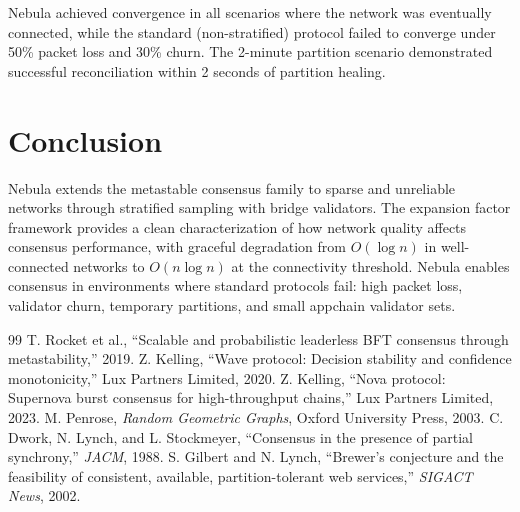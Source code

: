 \documentclass[11pt,a4paper]{article}
\begin{document}
Nebula achieved convergence in all scenarios where the network was eventually connected,
while the standard (non-stratified) protocol failed to converge under 50\% packet loss
and 30\% churn. The 2-minute partition scenario demonstrated successful reconciliation
within 2 seconds of partition healing.

\section{Conclusion}
\label{sec:conclusion}

Nebula extends the metastable consensus family to sparse and unreliable networks
through stratified sampling with bridge validators. The expansion factor framework
provides a clean characterization of how network quality affects consensus performance,
with graceful degradation from $O(\log n)$ in well-connected networks to $O(n \log n)$
at the connectivity threshold. Nebula enables consensus in environments where standard
protocols fail: high packet loss, validator churn, temporary partitions, and small
appchain validator sets.

\begin{thebibliography}{99}
 T. Rocket et al., ``Scalable and probabilistic leaderless BFT consensus through metastability,'' 2019.
 Z. Kelling, ``Wave protocol: Decision stability and confidence monotonicity,'' Lux Partners Limited, 2020.
 Z. Kelling, ``Nova protocol: Supernova burst consensus for high-throughput chains,'' Lux Partners Limited, 2023.
 M. Penrose, \emph{Random Geometric Graphs}, Oxford University Press, 2003.
 C. Dwork, N. Lynch, and L. Stockmeyer, ``Consensus in the presence of partial synchrony,'' \emph{JACM}, 1988.
 S. Gilbert and N. Lynch, ``Brewer's conjecture and the feasibility of consistent, available, partition-tolerant web services,'' \emph{SIGACT News}, 2002.
\end{thebibliography}
\end{document}
